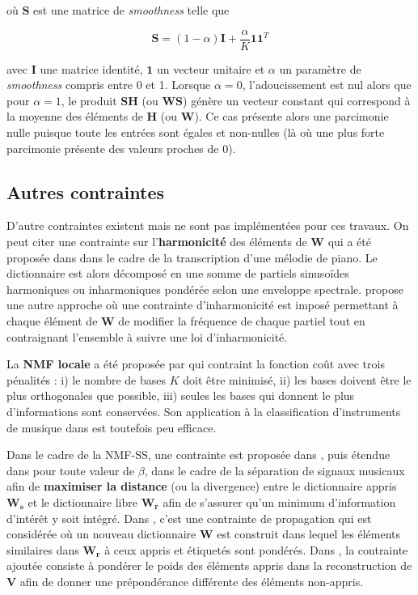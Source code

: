 où $\mathbf{S}$ est une matrice de \textit{smoothness} telle que 

\begin{equation}
\mathbf{S} = (1-\alpha)\mathbf{I}+\frac{\alpha}{K}\mathbf{11}^T
\end{equation}

avec $\mathbf{I}$ une matrice identité, $\mathbf{1}$ un vecteur unitaire et $\alpha$ un paramètre de \textit{smoothness} compris entre 0 et 1. Lorsque $\alpha = 0$, l'adoucissement est nul alors que pour $\alpha = 1$, le produit $\mathbf{SH}$ (ou $\mathbf{WS}$) génère un vecteur constant qui correspond à la moyenne des éléments de $\mathbf{H}$ (ou $\mathbf{W}$). Ce cas présente alors une parcimonie nulle puisque toute les entrées sont égales et non-nulles (là où une plus forte parcimonie présente des valeurs proches de 0).

\subsection{Autres contraintes}

D'autre contraintes existent mais ne sont pas implémentées pour ces travaux.
On peut citer une contrainte sur l'\textbf{harmonicité} des éléments de $\mathbf{W}$ qui a été proposée dans \cite{vincent2008harmonic} dans le cadre de la transcription d'une mélodie de piano. Le dictionnaire est alors décomposé en une somme de partiels sinusoïdes harmoniques ou inharmoniques pondérée selon une enveloppe spectrale. \cite{rigaud2012piano} propose une autre approche où une contrainte d'inharmonicité est imposé permettant à chaque élément de $\mathbf{W}$ de modifier la fréquence de chaque partiel tout en contraignant l'ensemble à suivre une loi d'inharmonicité.

La \textbf{NMF locale} a été proposée par \cite{li2001learning} qui contraint la fonction coût avec trois pénalités : i) le nombre de bases $K$ doit être minimisé, ii) les bases doivent être le plus orthogonales que possible, iii) seules les bases qui donnent le plus d'informations sont conservées. Son application à la classification d'instruments de musique dans \cite{benetos2006musical} est toutefois peu efficace.

Dans le cadre de la NMF-SS, une contrainte est proposée dans \cite{yagi2012music}, puis étendue dans \cite{kitamura2014music} pour toute valeur de $\beta$, dans le cadre de la séparation de signaux musicaux afin de \textbf{maximiser la distance} (ou la divergence) entre le dictionnaire appris $\mathbf{W_s}$ et le dictionnaire libre $\mathbf{W_r}$ afin de s'assurer qu'un minimum d'information d'intérêt y soit intégré. Dans \cite{wang2016semi}, c'est une contrainte de propagation qui est considérée où un nouveau dictionnaire $\mathbf{W}$ est construit dans lequel les éléments similaires dans $\mathbf{W_r}$ à ceux appris et étiquetés sont pondérés. Dans \cite{lefevre2012semi}, la contrainte ajoutée consiste à pondérer le poids des éléments appris dans la reconstruction de $\mathbf{V}$ afin de donner une prépondérance différente des éléments non-appris.

